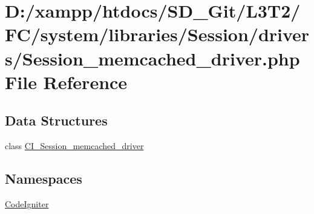 \hypertarget{system_2libraries_2_session_2drivers_2_session__memcached__driver_8php}{}\section{D\+:/xampp/htdocs/\+S\+D\+\_\+\+Git/\+L3\+T2/\+F\+C/system/libraries/\+Session/drivers/\+Session\+\_\+memcached\+\_\+driver.php File Reference}
\label{system_2libraries_2_session_2drivers_2_session__memcached__driver_8php}
\subsection*{Data Structures}
\begin{DoxyCompactItemize}
\item 
class \hyperlink{class_c_i___session__memcached__driver}{C\+I\+\_\+\+Session\+\_\+memcached\+\_\+driver}
\end{DoxyCompactItemize}
\subsection*{Namespaces}
\begin{DoxyCompactItemize}
\item 
 \hyperlink{namespace_code_igniter}{Code\+Igniter}
\end{DoxyCompactItemize}
